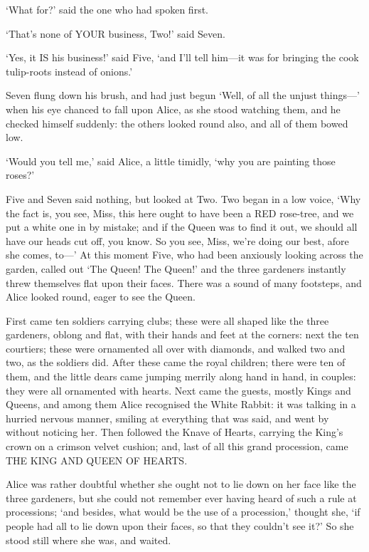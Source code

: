 \documentclass[12pt]{article}
\begin{document}
\begin{Parallel}[p]{}{}
{‘What for?’ said the one who had spoken first.

‘That’s none of YOUR business, Two!’ said Seven.

‘Yes, it IS his business!’ said Five, ‘and I’ll tell him—it was for bringing the cook tulip-roots instead of onions.’

Seven flung down his brush, and had just begun ‘Well, of all the unjust things—’ when his eye chanced to fall upon Alice, as she stood watching them, and he checked himself suddenly: the others looked round also, and all of them bowed low.

‘Would you tell me,’ said Alice, a little timidly, ‘why you are painting those roses?’

Five and Seven said nothing, but looked at Two. Two began in a low voice, ‘Why the fact is, you see, Miss, this here ought to have been a RED rose-tree, and we put a white one in by mistake; and if the Queen was to find it out, we should all have our heads cut off, you know. So you see, Miss, we’re doing our best, afore she comes, to—’ At this moment Five, who had been anxiously looking across the garden, called out ‘The Queen! The Queen!’ and the three gardeners instantly threw themselves flat upon their faces. There was a sound of many footsteps, and Alice looked round, eager to see the Queen.

First came ten soldiers carrying clubs; these were all shaped like the three gardeners, oblong and flat, with their hands and feet at the corners: next the ten courtiers; these were ornamented all over with diamonds, and walked two and two, as the soldiers did. After these came the royal children; there were ten of them, and the little dears came jumping merrily along hand in hand, in couples: they were all ornamented with hearts. Next came the guests, mostly Kings and Queens, and among them Alice recognised the White Rabbit: it was talking in a hurried nervous manner, smiling at everything that was said, and went by without noticing her. Then followed the Knave of Hearts, carrying the King’s crown on a crimson velvet cushion; and, last of all this grand procession, came THE KING AND QUEEN OF HEARTS.

Alice was rather doubtful whether she ought not to lie down on her face like the three gardeners, but she could not remember ever having heard of such a rule at processions; ‘and besides, what would be the use of a procession,’ thought she, ‘if people had all to lie down upon their faces, so that they couldn’t see it?’ So she stood still where she was, and waited.

}
\end{Parallel}
\end{document}
